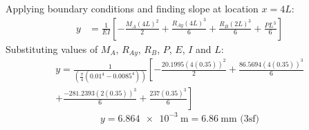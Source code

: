 \documentclass[11pt]{article}
\numberwithin{equation}{section}
\begin{document}
Applying boundary conditions and finding slope at location $x=4L$:
\begin{align}
    y &= \frac{1}{EI} \left[-\frac{M_A (4L)^2}{2} + \frac{R_{Ay}(4L)^3}{6} + \frac{R_B(2L)^3}{6} + \frac{PL^3}{6}\right]
\end{align}
Substituting values of $M_{A}$, $R_{Ay}$, $R_B$, $P$, $E$, $I$ and $L$:
\begin{multline}
    y = \frac{1}{\left(\frac{\pi}{4}\left(0.01^4-0.0085^4\right)\right)} \left[-\frac{20.1995 (4(0.35))^2}{2} + \frac{86.5694(4(0.35))^3}{6} \right. \\ \left. + \frac{-281.2393(2(0.35))^3}{6} + \frac{237(0.35)^3}{6}\right]
\end{multline}
\begin{equation}
    y = \SI{6.864e-3}{\meter} = \SI{6.86}{\milli \meter} \textrm{ (3sf)}
\end{equation}
\end{document}
